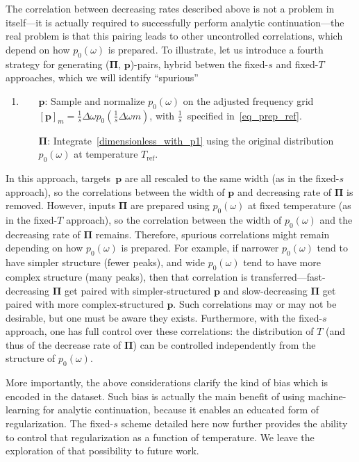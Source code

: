 \documentclass[notitlepage, 11pt, nofootinbib]{revtex4-1}
\renewcommand{\vec}[1]{\bm{#1}}
\begin{document}
The correlation between decreasing rates described above is not a problem in itself---it is actually required to successfully perform analytic continuation---the real problem is that this pairing leads to other uncontrolled correlations, which depend on how $p_0(\omega)$ is prepared.
To illustrate, let us introduce a fourth strategy for generating ($\vec \Pi$, $\vec p$)-pairs, hybrid betwen the fixed-$s$ and fixed-$T$ approaches, which we will identify ``spurious''
\begin{enumerate}[resume]
    \item \label{spurious}
    \begin{itemize}
        \item[$\vec p$:] Sample and normalize $p_0(\omega)$ on the adjusted frequency grid $[\vec p]_m = \frac{1}{s}\Delta\omega p_0(\frac{1}{s}\Delta\omega m)$, with $\frac{1}{s}$~specified in~\eqref{eq_prep_ref}.

        \item[$\vec \Pi$:] Integrate~\eqref{dimensionless_with_p1} using the original distribution $p_0(\omega)$ at temperature $T_{\text{ref}}$.
    \end{itemize}
\end{enumerate}
In this approach, targets~$\vec p$ are all rescaled to the same width (as in the fixed-$s$ approach), so the correlations between the width of $\vec p$ and decreasing rate of $\vec \Pi$ is removed.
However, inputs $\vec \Pi$ are prepared using $p_0(\omega)$ at fixed temperature (as in the fixed-$T$ approach), so the correlation between the width of $p_0(\omega)$ and the decreasing rate of $\vec \Pi$ remains.
Therefore, spurious correlations might remain depending on how $p_0(\omega)$ is prepared. For example, if narrower $p_0(\omega)$ tend to have simpler structure (fewer peaks), and wide $p_0(\omega)$ tend to have more complex structure (many peaks), then that correlation is transferred---fast-decreasing $\vec \Pi$ get paired with simpler-structured $\vec p$ and slow-decreasing $\vec \Pi$ get paired with more complex-structured $\vec p$.
Such correlations may or may not be desirable, but one must be aware they exists.
Furthermore, with the fixed-$s$ approach, one has full control over these correlations: the distribution of $T$ (and thus of the decrease rate of $\vec \Pi$) can be controlled independently from the structure of $p_0(\omega)$.

More importantly, the above considerations clarify the kind of bias which is encoded in the dataset. Such bias is actually the main benefit of using machine-learning for analytic continuation, because it enables an educated form of regularization. The fixed-$s$ scheme detailed here now further provides the ability to control that regularization as a function of temperature. We leave the exploration of that possibility to future work.
\end{document}
